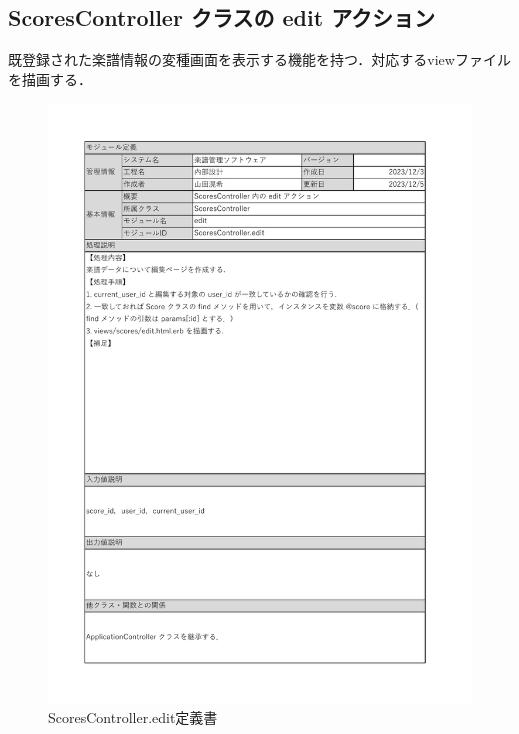 \subsection*{ScoresController クラスの edit アクション}
既登録された楽譜情報の変種画面を表示する機能を持つ．対応するviewファイルを描画する．
\begin{figure}[H]
    \centering
    \includegraphics[scale=0.6]{img/Scores/xlsx/ScoresController_edit.pdf}
    \vspace{-1cm}
    \caption{ScoresController.edit定義書}
\end{figure}
